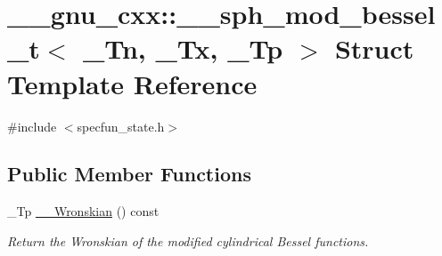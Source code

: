 \hypertarget{struct____gnu__cxx_1_1____sph__mod__bessel__t}{}\section{\+\_\+\+\_\+gnu\+\_\+cxx\+:\+:\+\_\+\+\_\+sph\+\_\+mod\+\_\+bessel\+\_\+t$<$ \+\_\+\+Tn, \+\_\+\+Tx, \+\_\+\+Tp $>$ Struct Template Reference}
\label{struct____gnu__cxx_1_1____sph__mod__bessel__t}


{\ttfamily \#include $<$specfun\+\_\+state.\+h$>$}

\subsection*{Public Member Functions}
\begin{DoxyCompactItemize}
\item 
\+\_\+\+Tp \hyperlink{struct____gnu__cxx_1_1____sph__mod__bessel__t_ab57ab75da4b6a7114c112ae3efb25398}{\+\_\+\+\_\+\+Wronskian} () const 
\begin{DoxyCompactList}\small\item\em Return the Wronskian of the modified cylindrical Bessel functions. \end{DoxyCompactList}\end{DoxyCompactItemize}
